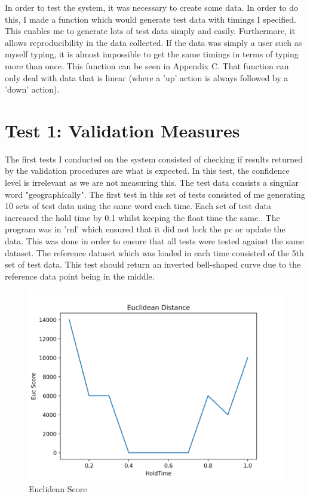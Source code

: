 \documentclass[10pt,a4paper]{report}
\begin{document}
In order to test the system, it was necessary to create some data. In order to do this, I made a function which would generate test data with timings I specified. This enables me to generate lots of test data simply and easily. Furthermore, it allows reproducibility in the data collected. If the data was simply a user such as myself typing, it is almost impossible to get the same timings in terms of typing more than once. This function can be seen in Appendix C. That function can only deal with data that is linear (where a 'up' action is always followed by a 'down' action).


\section{Test 1: Validation Measures}

The first tests I conducted on the system consisted of checking if results returned by the validation procedures are what is expected. In this test, the confidence level is irrelevant as we are not measuring this. The test data consists a singular word "geographically". The first test in this set of tests consisted of me generating 10 sets of test data using the same word each time. Each set of test data increased the hold time by 0.1 whilst keeping the float time the same.. The program was in 'rnl' which ensured that it did not lock the pc or update the data. This was done in order to ensure that all tests were tested against the same dataset. The reference dataset which was loaded in each time consisted of the 5th set of test data. This test should return an inverted bell-shaped curve due to the reference data point being in the middle. 

\begin{figure}
	\centering
	\includegraphics[scale=0.6]{EUCGraph}
	\caption{Euclidean Score}
	\label{fig:EucGraph}
\end{figure}
\end{document}
